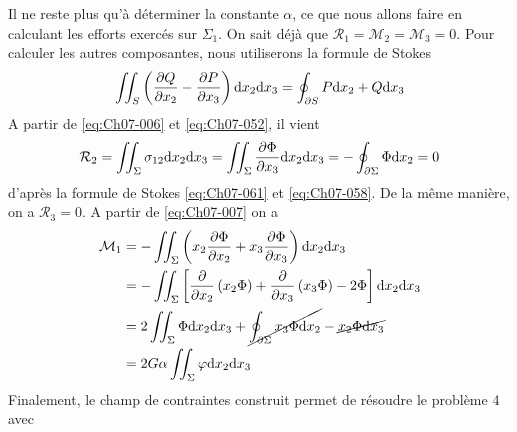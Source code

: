 Il ne reste plus qu'à déterminer la constante $\alpha$, ce que nous allons faire en calculant les efforts exercés sur $\Sigma_1$.
On sait déjà que $\mathcal{R}_1 = \mathcal{M}_2 = \mathcal{M}_3 = 0$.
Pour calculer les autres composantes, nous utiliserons la formule de Stokes
\begin{equation}
    \iint_{S} \left( \frac{\partial Q}{\partial x_2} - \frac{\partial P}{\partial x_3} \right) \mathrm{d} x_2 \mathrm{d} x_3 = \oint_{\partial S} P \mathrm{d} x_2 + Q \mathrm{d} x_3
    \label{eq:Ch07-061}
\end{equation}
A partir de \eqref{eq:Ch07-006} et \eqref{eq:Ch07-052}, il vient
\begin{equation}
    \mathcal{R}_2 = \iint_{\Sigma} \sigma_{12} \mathrm{d} x_2 \mathrm{d} x_3 = \iint_{\Sigma} \frac{\partial \Phi}{\partial x_3} \mathrm{d} x_2 \mathrm{d} x_3 = - \oint_{\partial \Sigma} \Phi \mathrm{d} x_2 = 0
    \label{eq:Ch07-062}
\end{equation}
d'après la formule de Stokes \eqref{eq:Ch07-061} et \eqref{eq:Ch07-058}.
De la même manière, on a $\mathcal{R}_3 = 0$.
A partir de \eqref{eq:Ch07-007} on a
\begin{equation}
    \begin{aligned}
        \mathcal{M}_1 &= -\iint_{\Sigma} \left( x_2 \frac{\partial \Phi}{\partial x_2} + x_3 \frac{\partial \Phi}{\partial x_3} \right) \mathrm{d} x_2 \mathrm{d} x_3 \\
        &= -\iint_{\Sigma} \left[ \frac{\partial}{\partial x_2} \left( x_2 \Phi \right) + \frac{\partial}{\partial x_3} \left( x_3 \Phi \right) - 2\Phi \right] \mathrm{d} x_2 \mathrm{d} x_3 \\
        &= 2 \iint_{\Sigma} \Phi \mathrm{d} x_2 \mathrm{d} x_3 + \cancel{\oint_{\partial \Sigma} x_3 \Phi \mathrm{d} x_2} - \cancel{x_2 \Phi \mathrm{d} x_3} \\
        &= 2 G \alpha \iint_{\Sigma} \varphi \mathrm{d} x_2 \mathrm{d} x_3
    \end{aligned}
    \label{eq:Ch07-063}
\end{equation}
Finalement, le champ de contraintes construit permet de résoudre le problème 4 avec
\endinput
\eqref{eq:Ch06-064} 

l = 

La constante l est appelée "module de rigidité" de la section L , et, com­
me <f ' elle ne dépend que de la forrne de L . 
En chaque point de la section, l'état de contraintes est un état
-
de cisaillement simple caractérisé par le vecteur contrainte T associé à la section droite 
... 
\eqref{eq:Ch06-065} 
T = (0 1 <r1~ , ~;) 
-+ 
La CL \eqref{eq:Ch07-001} expnme que, sur la frontière dL , T est tangent à dL 
\eqref{eq:Ch06-066} sur ÔL 

